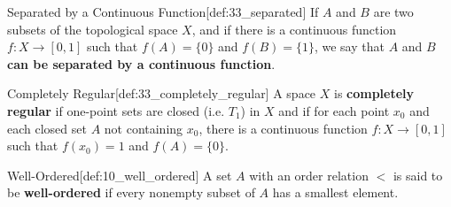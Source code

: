 \begin{defBox}{Separated by a Continuous Function}[def:33_separated]
    If \( A \) and \( B \) are two subsets of the topological space \( X \), and if
    there is a continuous function \( f: X \rightarrow [ 0, 1 ] \) such that 
    \( f ( A ) = \{ 0 \} \) and \( f ( B ) = \{ 1 \} \), we say that \( A \) and 
    \( B \) \textbf{can be separated by a continuous function}.
\end{defBox}

\begin{defBox}{Completely Regular}[def:33_completely_regular]
    A space \( X \) is \textbf{completely regular} if one-point sets are closed
    (i.e. \( T_{ 1 } \)) in \( X \) and if for each point \( x_{ 0 } \) and each 
    closed set \( A \) not containing \( x_{ 0 } \), there is a continuous function
    \( f: X \rightarrow [ 0, 1 ] \) such that \( f ( x_{ 0 } ) = 1 \) and 
    \( f ( A ) = \{ 0 \} \).
\end{defBox}

\begin{defBox}{Well-Ordered}[def:10_well_ordered]
    A set \( A \) with an order relation \( < \) is said to be \textbf{well-ordered} if
    every nonempty subset of \( A \) has a smallest element.
\end{defBox}